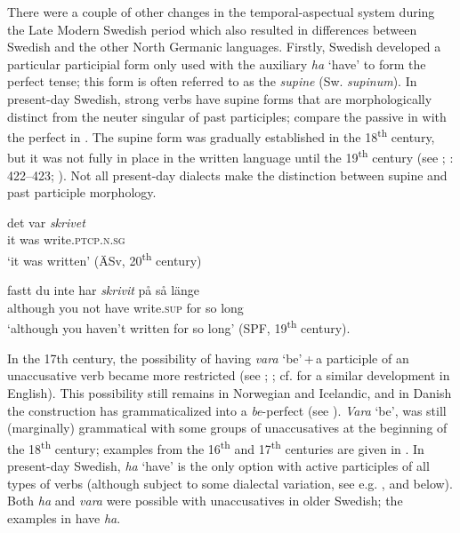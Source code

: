 \documentclass[output=paper]{langscibook}
\begin{document}
There were a couple of other changes in the temporal-aspectual system during the Late Modern Swedish period which also resulted in differences between Swedish and the other North Germanic languages. Firstly, Swedish developed a particular participial form only used with the auxiliary \textit{ha} ‘have’ to form the perfect tense; this form is often referred to as the \textit{supine} (Sw. \textit{supinum}). In present-day Swedish, strong verbs have supine forms that are morphologically distinct from the neuter singular of past participles; compare the passive in  with the perfect in . The supine form was gradually established in the 18\textsuperscript{th} century, but it was not fully in place in the written language until the 19\textsuperscript{th} century (see \citealt{Platzack1981}; \citealt{Larsson2009}: 422–423; \citealt{Backstrom2019}). Not all present-day dialects make the distinction between supine and past participle morphology.


\ea\label{ex:intro:7}
\ea\label{ex:intro:7a}
\gll  det    var \textit{skrivet} \\
it   was write.\textsc{ptcp.n.sg}\\
\glt    ‘it was written’ (ÄSv, 20\textsuperscript{th} century)


\ex\label{ex:intro:7b}
\gll  fastt       du   inte   har \textit{skrivit}  på   så   länge\\
      although   you   not   have   write.\textsc{sup}   for   so long\\
\glt    ‘although you haven’t written for so long’ (SPF, 19\textsuperscript{th} century).
\z
\z


In the 17th century, the possibility of having \textit{vara} ‘be’\,+\,a participle of an unaccusative verb became more restricted (see \citealt{Johannisson1945}; \citealt{Larsson2009,Larsson2015}; cf. \citealt{McFaddenAlexiadou2005} for a similar development in English). This possibility still remains in Norwegian and Icelandic, and in Danish the construction has grammaticalized into a \textit{be}{}-perfect (see \citealt{Larsson2021Emergence}). \textit{Vara} ‘be’, was still (marginally) grammatical with some groups of unaccusatives at the beginning of the 18\textsuperscript{th} century; examples from the 16\textsuperscript{th} and 17\textsuperscript{th} centuries are given in . In present-day Swedish, \textit{ha} ‘have’ is the only option with active participles of all types of verbs (although subject to some dialectal variation, see e.g. \citealt{Larsson2014HAVE}, and  below). Both \textit{ha} and \textit{vara} were possible with unaccusatives in older Swedish; the examples in  have \textit{ha}.
\end{document}
